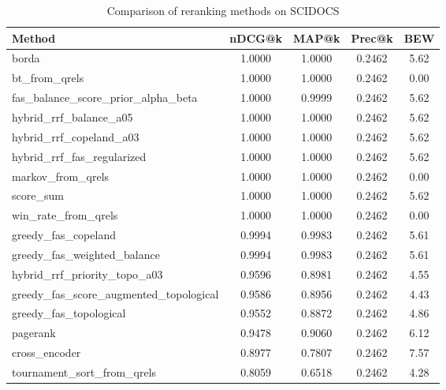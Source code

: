 \begin{table}[ht]
\centering
\caption{Comparison of reranking methods on SCIDOCS}
\label{tab:modern_baselines_scidocs}
\begin{tabular}{lcccc}
\toprule
Method & nDCG@k & MAP@k & Prec@k & BEW \\
\midrule
borda & 1.0000 & 1.0000 & 0.2462 & 5.62 \\
bt\_from\_qrels & 1.0000 & 1.0000 & 0.2462 & 0.00 \\
fas\_balance\_score\_prior\_alpha\_beta & 1.0000 & 0.9999 & 0.2462 & 5.62 \\
hybrid\_rrf\_balance\_a05 & 1.0000 & 1.0000 & 0.2462 & 5.62 \\
hybrid\_rrf\_copeland\_a03 & 1.0000 & 1.0000 & 0.2462 & 5.62 \\
hybrid\_rrf\_fas\_regularized & 1.0000 & 1.0000 & 0.2462 & 5.62 \\
markov\_from\_qrels & 1.0000 & 1.0000 & 0.2462 & 0.00 \\
score\_sum & 1.0000 & 1.0000 & 0.2462 & 5.62 \\
win\_rate\_from\_qrels & 1.0000 & 1.0000 & 0.2462 & 0.00 \\
greedy\_fas\_copeland & 0.9994 & 0.9983 & 0.2462 & 5.61 \\
greedy\_fas\_weighted\_balance & 0.9994 & 0.9983 & 0.2462 & 5.61 \\
hybrid\_rrf\_priority\_topo\_a03 & 0.9596 & 0.8981 & 0.2462 & 4.55 \\
greedy\_fas\_score\_augmented\_topological & 0.9586 & 0.8956 & 0.2462 & 4.43 \\
greedy\_fas\_topological & 0.9552 & 0.8872 & 0.2462 & 4.86 \\
pagerank & 0.9478 & 0.9060 & 0.2462 & 6.12 \\
cross\_encoder & 0.8977 & 0.7807 & 0.2462 & 7.57 \\
tournament\_sort\_from\_qrels & 0.8059 & 0.6518 & 0.2462 & 4.28 \\
\bottomrule
\end{tabular}
\end{table}